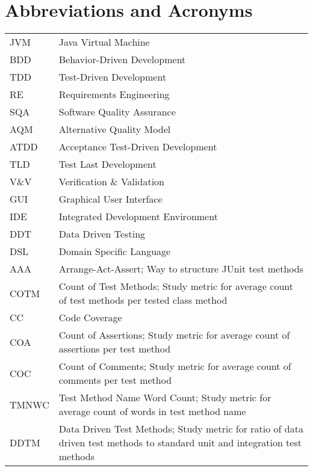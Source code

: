 \chapter*{Abbreviations and Acronyms}


\noindent
\begin{longtable}{@{}p{}p{}@{}}
JVM & Java Virtual Machine \\
BDD & Behavior-Driven Development \\
TDD & Test-Driven Development \\
RE & Requirements Engineering \\
SQA & Software Quality Assurance \\
AQM & Alternative Quality Model \\
ATDD & Acceptance Test-Driven Development \\
TLD & Test Last Development \\
V\&V & Verification \& Validation \\
GUI & Graphical User Interface \\
IDE & Integrated Development Environment \\
DDT & Data Driven Testing \\
DSL & Domain Specific Language \\
AAA & Arrange-Act-Assert; Way to structure JUnit test methods \\
COTM & Count of Test Methods; Study metric for average count of test methods per tested class method \\
CC & Code Coverage \\
COA & Count of Assertions; Study metric for average count of assertions per test method \\
COC & Count of Comments; Study metric for average count of comments per test method \\
TMNWC & Test Method Name Word Count; Study metric for average count of words in test method name \\
DDTM & Data Driven Test Methods; Study metric for ratio of data driven test methods to standard unit and integration test methods \\
\end{longtable}
